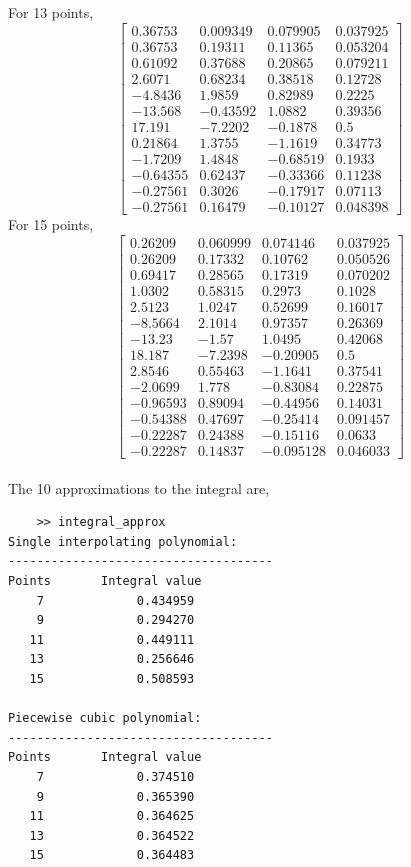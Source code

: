 \documentclass{article}
\newcommand{\bmat}[1]{\begin{bmatrix} #1 \end{bmatrix}}
\begin{document}
For 13 points,
$$\bmat{0.36753  &   0.009349  &   0.079905  &   0.037925\\
0.36753   &   0.19311   &   0.11365   &  0.053204\\
0.61092   &   0.37688   &   0.20865   &  0.079211\\
 2.6071   &   0.68234   &   0.38518   &   0.12728\\
-4.8436   &    1.9859   &   0.82989   &    0.2225\\
-13.568   &  -0.43592   &    1.0882   &   0.39356\\
 17.191   &   -7.2202   &   -0.1878   &       0.5\\
0.21864   &    1.3755   &   -1.1619   &   0.34773\\
-1.7209   &    1.4848   &  -0.68519   &    0.1933\\
-0.64355  &    0.62437  &   -0.33366  &    0.11238\\
-0.27561  &     0.3026  &   -0.17917  &    0.07113\\
-0.27561  &    0.16479  &   -0.10127  &   0.048398}$$
For 15 points,
$$\bmat{0.26209   &  0.060999  &   0.074146  &   0.037925\\
0.26209   &   0.17332   &   0.10762  &   0.050526\\
0.69417   &   0.28565   &   0.17319  &   0.070202\\
 1.0302   &   0.58315   &    0.2973  &     0.1028\\
 2.5123   &    1.0247   &   0.52699  &    0.16017\\
-8.5664   &    2.1014   &   0.97357  &    0.26369\\
 -13.23   &     -1.57   &    1.0495  &    0.42068\\
 18.187   &   -7.2398   &  -0.20905  &        0.5\\
 2.8546   &   0.55463   &   -1.1641  &    0.37541\\
-2.0699   &     1.778   &  -0.83084  &    0.22875\\
-0.96593  &    0.89094  &   -0.44956 &     0.14031\\
-0.54388  &    0.47697  &   -0.25414 &    0.091457\\
-0.22287  &    0.24388  &   -0.15116 &      0.0633\\
-0.22287  &    0.14837  &  -0.095128 &    0.046033}$$
\\
The 10 approximations to the integral are,
\begin{verbatim}
    >> integral_approx
Single interpolating polynomial:
-------------------------------------
Points       Integral value
    7             0.434959
    9             0.294270
   11             0.449111
   13             0.256646
   15             0.508593

Piecewise cubic polynomial:
-------------------------------------
Points       Integral value
    7             0.374510
    9             0.365390
   11             0.364625
   13             0.364522
   15             0.364483
\end{verbatim}
\end{document}
